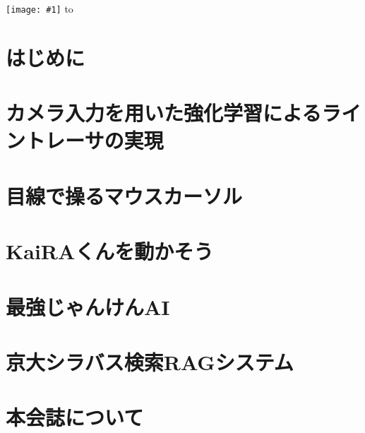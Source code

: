 \documentclass[dvipdfmx,openany]{jsbook}
\makeatletter
\numberwithin{equation}{section}     %
\def\@haikei#1{
\setbox\BackGroundUnit\hbox{\texttt{[image: \#1]}}
\@tempdima\paperheight
\advance\@tempdima\ht\BackGroundUnit\advance\@tempdima\dp\BackGroundUnit
\setbox\BackGround\vbox to \@tempdima{
        \@tempdima=\paperwidth\advance\@tempdima\wd\BackGroundUnit
        \leaders\hbox to\@tempdima{\leaders\copy\BackGroundUnit\hfil}\vfil
}
\wd\BackGround=0pt\ht\BackGround=0pt\dp\BackGround=0pt
}
\newcommand{\incluedefullgraphics}[1]{\pagestyle{empty}\@haikei{#1}\null}
\makeatother
\begin{document}
\begin{titlepage}
  \thispagestyle{empty}
  \incluedefullgraphics{cover.png}
\end{titlepage}

\chapter*{はじめに}


\tableofcontents

\chapter{カメラ入力を用いた強化学習によるライントレーサの実現}\label{chap:line-tracer}


\chapter{目線で操るマウスカーソル}\label{chap:eye-track-cursor}


\chapter{KaiRAくんを動かそう}\label{chap:moving-kaira-kun}


\chapter{最強じゃんけんAI}\label{chap:no-lose-janken}


\chapter{京大シラバス検索RAGシステム}\label{chap:syllabus-rag}





\nocite{*}

\chapter*{本会誌について}
\end{document}
